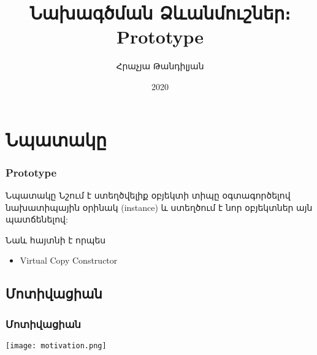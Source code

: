 \documentclass{beamer}
\begin{document}
\title[Prototype]{Նախագծման Ձևանմուշներ։ Prototype}
\author[Հրաչյա Թանդիլյան\copyright]{Հրաչյա Թանդիլյան}
\date{2020}

\begin{frame}
\titlepage
\end{frame}

\section{Նպատակը}
\begin{frame}\frametitle{Prototype}
\begin{block}{Նպատակը}
    Նշում է ստեղծվելիք օբյեկտի տիպը օգտագործելով նախատիպային օրինակ (instance)
    և ստեղծում է նոր օբյեկտներ այն պատճենելով:
\end{block}
\vfill
Նաև հայտնի է որպես
\begin{itemize}
    \item Virtual Copy Constructor
\end{itemize}
\end{frame}

\subsection{Մոտիվացիան}
\begin{frame}\frametitle{Մոտիվացիան}
\begin{center}
    \texttt{[image: motivation.png]}
\end{center}
\end{frame}
\end{document}
